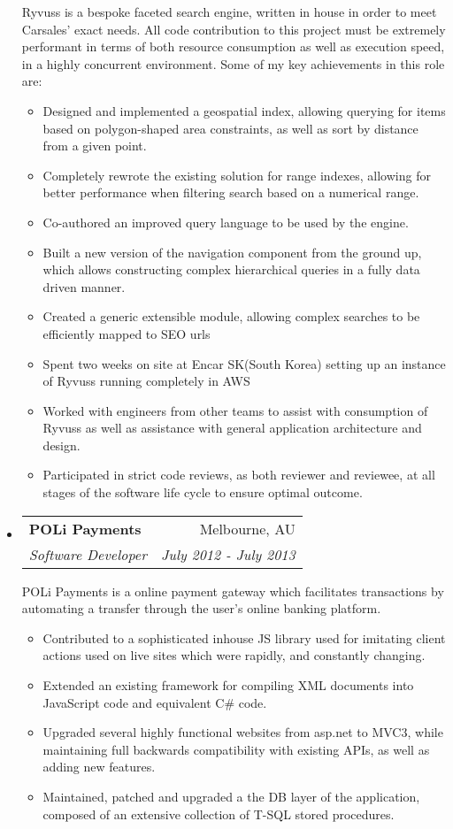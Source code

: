 \documentclass[letterpaper,11pt]{article}
\makeatletter
\newcommand{\resitem}[1]{\item #1 \vspace{-2pt}}
\newcommand{\ressubheading}[4]{
\begin{tabular*}{6.5in}{l@{\cftdotfill{\cftsecdotsep}\extracolsep{\fill}}r}
		\textbf{#1} & #2 \\
		\textit{#3} & \textit{#4} \\
\end{tabular*}}
\makeatother
\begin{document}
\begin{itemize}
	Ryvuss is a bespoke faceted search engine, written in house in order to meet Carsales' exact needs. All code contribution to this project must be extremely performant in terms of both resource consumption as well as execution speed, in a highly concurrent environment. Some of my key achievements in this role are:

	\begin{itemize}
		\resitem{Designed and implemented a geospatial index, allowing querying for items based on polygon-shaped area constraints, as well as sort by distance from a given point.}
		\resitem{Completely rewrote the existing solution for range indexes, allowing for better performance when filtering search based on a numerical range.}
		\resitem{Co-authored an improved query language to be used by the engine.}
		\resitem{Built a new version of the navigation component from the ground up, which allows constructing complex hierarchical queries in a fully data driven manner.}
		\resitem{Created a generic extensible module, allowing complex searches to be efficiently mapped to SEO urls}
		\resitem{Spent two weeks on site at Encar SK(South Korea) setting up an instance of Ryvuss running completely in AWS}
		\resitem{Worked with engineers from other teams to assist with consumption of Ryvuss as well as assistance with general application architecture and design.}
		\resitem{Participated in strict code reviews, as both reviewer and reviewee, at all stages of the software life cycle to ensure optimal outcome.}
	\end{itemize}

\item[]
	\ressubheading{POLi Payments}{Melbourne, AU}{Software Developer}{July 2012 - July 2013}
	
	POLi Payments is a online payment gateway which facilitates transactions by automating a transfer through the user's online banking platform. 
	\begin{itemize}
		\resitem{Contributed to a sophisticated inhouse JS library used for imitating client actions used on live sites which were rapidly, and constantly changing.}
		\resitem{Extended an existing framework for compiling XML documents into JavaScript code and equivalent C\# code.}
		\resitem{Upgraded several highly functional websites from asp.net to MVC3, while maintaining full backwards compatibility with existing APIs, as well as adding new features.} 
		\resitem{Maintained, patched and upgraded a the DB layer of the application, composed of an extensive collection of T-SQL stored procedures.}
	\end{itemize}
	

\end{itemize}
\end{document}
